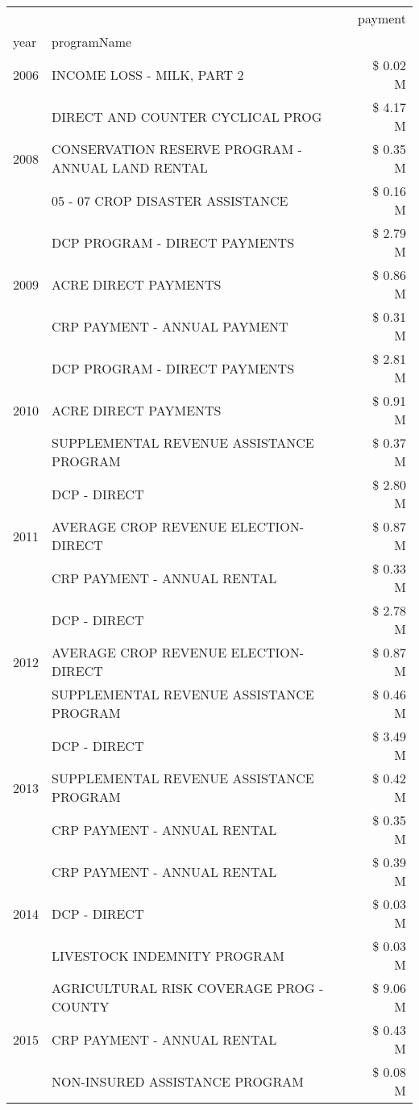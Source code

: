 \begin{tabular}{llr}
\toprule
 &  & payment \\
year & programName &  \\
\midrule
2006 & INCOME LOSS - MILK, PART 2 & \$ 0.02 M \\
\cline{1-3}
\multirow[t]{3}{*}{2008} & DIRECT AND COUNTER CYCLICAL PROG & \$ 4.17 M \\
 & CONSERVATION RESERVE PROGRAM - ANNUAL LAND RENTAL & \$ 0.35 M \\
 & 05 - 07 CROP DISASTER ASSISTANCE & \$ 0.16 M \\
\cline{1-3}
\multirow[t]{3}{*}{2009} & DCP PROGRAM - DIRECT PAYMENTS & \$ 2.79 M \\
 & ACRE DIRECT PAYMENTS & \$ 0.86 M \\
 & CRP PAYMENT - ANNUAL PAYMENT & \$ 0.31 M \\
\cline{1-3}
\multirow[t]{3}{*}{2010} & DCP PROGRAM - DIRECT PAYMENTS & \$ 2.81 M \\
 & ACRE DIRECT PAYMENTS & \$ 0.91 M \\
 & SUPPLEMENTAL REVENUE ASSISTANCE PROGRAM & \$ 0.37 M \\
\cline{1-3}
\multirow[t]{3}{*}{2011} & DCP - DIRECT & \$ 2.80 M \\
 & AVERAGE CROP REVENUE ELECTION-DIRECT & \$ 0.87 M \\
 & CRP PAYMENT - ANNUAL RENTAL & \$ 0.33 M \\
\cline{1-3}
\multirow[t]{3}{*}{2012} & DCP - DIRECT & \$ 2.78 M \\
 & AVERAGE CROP REVENUE ELECTION-DIRECT & \$ 0.87 M \\
 & SUPPLEMENTAL REVENUE ASSISTANCE PROGRAM & \$ 0.46 M \\
\cline{1-3}
\multirow[t]{3}{*}{2013} & DCP - DIRECT & \$ 3.49 M \\
 & SUPPLEMENTAL REVENUE ASSISTANCE PROGRAM & \$ 0.42 M \\
 & CRP PAYMENT - ANNUAL RENTAL & \$ 0.35 M \\
\cline{1-3}
\multirow[t]{3}{*}{2014} & CRP PAYMENT - ANNUAL RENTAL & \$ 0.39 M \\
 & DCP - DIRECT & \$ 0.03 M \\
 & LIVESTOCK INDEMNITY PROGRAM & \$ 0.03 M \\
\cline{1-3}
\multirow[t]{3}{*}{2015} & AGRICULTURAL RISK COVERAGE PROG - COUNTY & \$ 9.06 M \\
 & CRP PAYMENT - ANNUAL RENTAL & \$ 0.43 M \\
 & NON-INSURED ASSISTANCE PROGRAM & \$ 0.08 M \\

\end{tabular}
